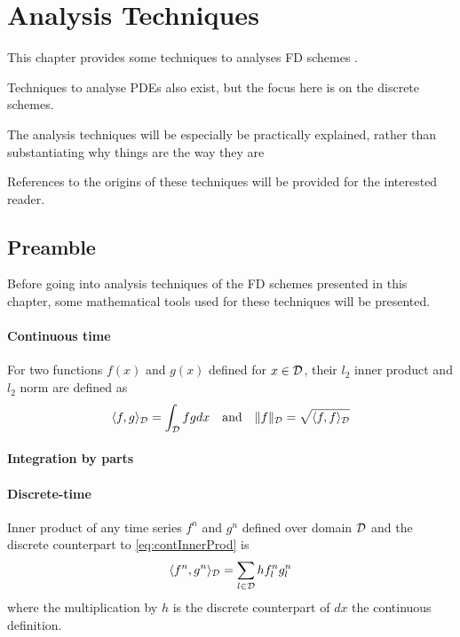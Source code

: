 \chapter{Analysis Techniques}\label{ch:analysis}

This chapter provides some techniques to analyses FD schemes .

Techniques to analyse PDEs also exist, but the focus here is on the discrete schemes.

The analysis techniques will be especially be practically explained, rather than substantiating why things are the way they are  

References to the origins of these techniques will be provided for the interested reader. 

\section{Preamble}


Before going into analysis techniques of the FD schemes presented in this chapter, some mathematical tools used for these techniques will be presented. 

\subsubsection{Continuous time}
For two functions $f(x)$ and $g(x)$ defined for $x\in\mathcal{D}$, their $l_2$ inner product and $l_2$ norm are defined as
\begin{equation}\label{eq:contInnerProd}
    \langle f, g\rangle_{\mathcal{D}} = \int_{\mathcal{D}} fg dx \quad \text{and} \quad \lVert f \rVert_{\mathcal{D}} = \sqrt{\langle f, f \rangle_{\mathcal{D}}}
\end{equation}

\subsubsection{Integration by parts}


\subsubsection{Discrete-time}
Inner product of any time series $f^n$ and $g^n$ defined over domain $\mathcal{D}$ and the discrete counterpart to \eqref{eq:contInnerProd} is
\begin{equation}\label{eq:discInnerProd}
    \langle f^n, g^n \rangle_{\mathcal{D}} = \sum_{l\in\mathcal{D}} h f_l^n g_l^n
\end{equation}
where the multiplication by $h$ is the discrete counterpart of $dx$ the continuous definition. 

